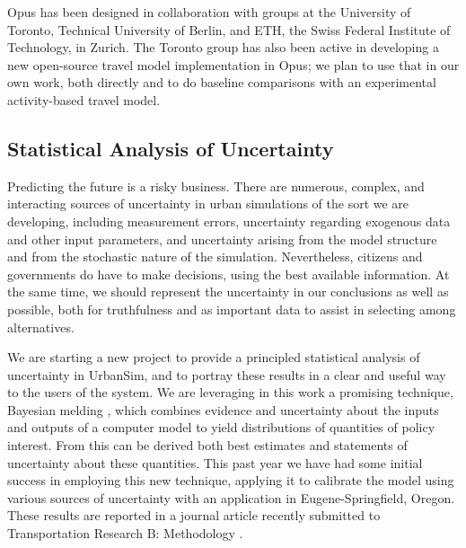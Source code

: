\documentclass{acm_proc_article-sp}
\begin{document}
Opus has been designed in collaboration with groups at the
University of Toronto, Technical University of Berlin, and ETH,
the Swiss Federal Institute of Technology, in Zurich. The Toronto
group has also been active in developing a new open-source travel
model implementation in Opus; we plan to use that in our own work,
both directly and to do baseline comparisons with an experimental
activity-based travel model.

%

\subsection{Statistical Analysis of Uncertainty}

Predicting the future is a risky business.  There are numerous,
complex, and interacting sources of uncertainty in urban
simulations of the sort we are developing, including measurement
errors, uncertainty regarding exogenous data and other input
parameters, and uncertainty arising from the model structure and
from the stochastic nature of the simulation. Nevertheless,
citizens and governments do have to make decisions, using the best
available information.  At the same time, we should represent the
uncertainty in our conclusions as well as possible, both for
truthfulness and as important data to assist in selecting among
alternatives.

We are starting a new project to provide a principled statistical
analysis of uncertainty in UrbanSim, and to portray these results
in a clear and useful way to the users of the system.  We are
leveraging in this work a promising technique, Bayesian melding
\cite{poole-jasa-2000,raftery-jasa-1995}, which combines evidence
and uncertainty about the inputs and outputs of a computer model
to yield distributions of quantities of policy interest.  From
this can be derived both best estimates and statements of
uncertainty about these quantities. This past year we have had
some initial success in employing this new technique, applying it
to calibrate the model using various sources of uncertainty with
an application in Eugene-Springfield, Oregon. These results are
reported in a journal article recently submitted to Transportation
Research B: Methodology \cite{sevcikova-trb-2006}.
\end{document}
